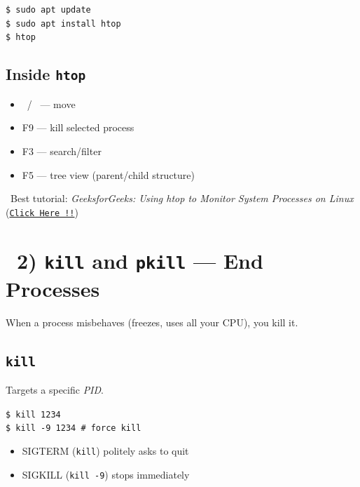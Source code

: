 \documentclass[12pt]{article}
\newcommand{\killicon}{\faSkullCrossbones}
\newcommand{\arrowicon}{\faArrowRight}
\begin{document}
\begin{highlightbox}
\texttt{\$ sudo apt update}\\
\texttt{\$ sudo apt install htop}\\
\texttt{\$ htop}
\end{highlightbox}

\subsection*{Inside \texttt{htop}}

\begin{itemize}
    \item \faArrowUp\ / \faArrowDown\ — move
    \item F9 — kill selected process
    \item F3 — search/filter
    \item F5 — tree view (parent/child structure)
\end{itemize}

\begin{infobox}
\arrowicon\ Best tutorial: \textit{GeeksforGeeks: Using htop to Monitor System Processes on Linux} (\href{https://www.geeksforgeeks.org/linux-unix/using-htop-to-monitor-system-processes-on-linux/}{\texttt{Click Here !!}})
\end{infobox}

\section*{\killicon\ 2) \texttt{kill} and \texttt{pkill} — End Processes}

When a process misbehaves (freezes, uses all your CPU), you kill it.

\subsection*{\texttt{kill}}

Targets a specific \textit{PID}.

\begin{highlightbox}
\texttt{\$ kill 1234}\\
\texttt{\$ kill -9 1234    \# force kill}
\end{highlightbox}

\begin{itemize}
    \item SIGTERM (\texttt{kill}) politely asks to quit
    \item SIGKILL (\texttt{kill -9}) stops immediately
\end{itemize}
\end{document}
